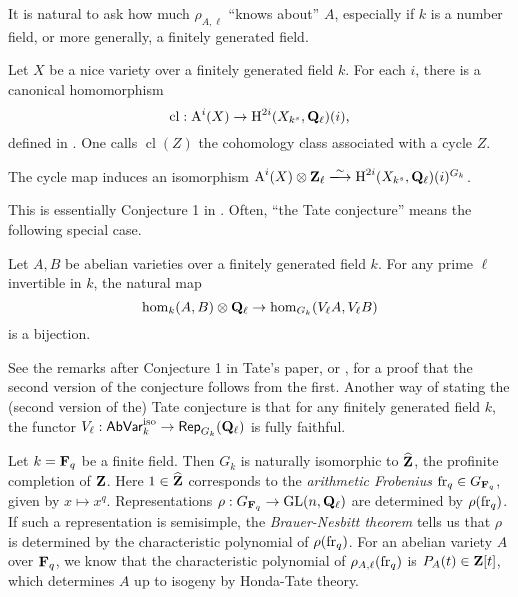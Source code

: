 It is natural to ask how much $\rho_{A,\ell}$ ``knows about'' $A$, especially 
if $k$ is a number field, or more generally, a finitely generated field. 

Let $X$ be a nice variety over a finitely generated field $k$. For each $i$, 
there is a canonical homomorphism 
\[
  \operatorname{cl}:\operatorname{A}^i(X) \to \operatorname{H}^{2 i}(X_{k^s},\mathbf{Q}_\ell)(i)\text{,}
\]
defined in \cite[VI 2.2.10]{de77}. One calls $\operatorname{cl}(Z)$ the 
cohomology class associated with a cycle $Z$. 

\begin{conjecture}[Tate]
The cycle map induces an isomorphism 
$\chow^i(X)\otimes\dZ_\ell \isomorphism \h^{2 i}(X_{k^s},\dQ_\ell)(i)^{G_k}$. 
\end{conjecture}

This is essentially Conjecture 1 in \cite{ta65}. Often, ``the Tate conjecture'' 
means the following special case. 

\begin{conjecture}[Tate]
Let $A,B$ be abelian varieties over a finitely generated field $k$. For any 
prime $\ell$ invertible in $k$, the natural map 
\[
  \hom_k(A,B)\otimes\mathbf{Q}_\ell \to \hom_{G_k}(V_\ell A, V_\ell B) 
\]
is a bijection. 
\end{conjecture}

See the remarks after Conjecture 1 in Tate's paper, or 
\cite[IV.1.4]{fa84}, for a proof that the second version of the conjecture 
follows from the first. Another way of stating the (second version 
of the) Tate conjecture is that for any finitely generated field $k$, the 
functor $V_\ell:\mathsf{AbVar}_k^\text{iso} \to \mathsf{Rep}_{G_k}(\mathbf{Q}_\ell)$ 
is fully faithful. 

\begin{example}
Let $k=\mathbf{F}_q$ be a finite field. Then $G_k$ is naturally isomorphic to 
$\widehat{\mathbf{Z}}$, the profinite completion of $\mathbf{Z}$. Here $1\in \widehat{\mathbf{Z}}$ 
corresponds to the \emph{arithmetic Frobenius} $\mathrm{fr}_q\in G_{\mathbf{F}_q}$, given by 
$x\mapsto x^q$. Representations 
$\rho:G_{\mathbf{F}_q} \to \operatorname{GL}(n,\mathbf{Q}_\ell)$ are determined by 
$\rho(\mathrm{fr}_q)$. If such a representation is semisimple, the 
\emph{Brauer-Nesbitt theorem} tells us that $\rho$ is determined by the 
characteristic polynomial of $\rho(\mathrm{fr}_q)$. For an abelian variety $A$ over 
$\mathbf{F}_q$, we know that the characteristic polynomial of 
$\rho_{A,\ell}(\mathrm{fr}_q)$ is $P_A(t)\in \mathbf{Z}[t]$, which determines $A$ up to 
isogeny by Honda-Tate theory. 
\end{example}

